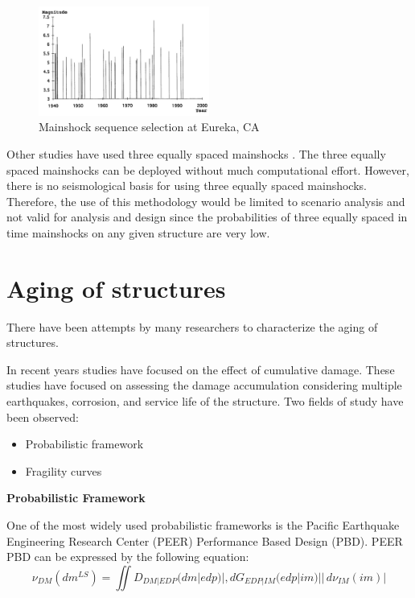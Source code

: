 \begin{figure}[htbp]
\centering
\includegraphics[width=0.5\textwidth]{Chapter-2/figs/Mainshock_sequence_01}
\caption{Mainshock sequence selection at Eureka, CA \cite{Sunasaka1993}}
\label{fig:MS-MS_Sunasaka}
\end{figure}

Other studies have used three equally spaced mainshocks \cite{Hatzigeorgiou2009}. The three equally spaced mainshocks can be deployed without much computational effort. However, there is no seismological basis for using three equally spaced mainshocks. Therefore, the use of this methodology would be limited to scenario analysis and not valid for analysis and design since the probabilities of three equally spaced in time mainshocks on any given structure are very low.

\section{Aging of structures}

There have been attempts by many researchers to characterize the aging of structures.

In recent years studies have focused on the effect of cumulative damage. These studies have focused on assessing the damage accumulation considering multiple earthquakes, corrosion, and service life of the structure. Two fields of study have been observed:

\begin{itemize}
	\item Probabilistic framework
	\item Fragility curves
\end{itemize}

\textbf{Probabilistic Framework}

One of the most widely used probabilistic frameworks is the Pacific Earthquake Engineering Research Center (PEER) Performance Based Design (PBD). PEER PBD can be expressed by the following equation:
\begin{equation}
\nu_{DM}(dm^{LS})=\iint D_{DM|EDP}(dm|edp)|,dG_{EDP|IM}(edp|im)||\,d\nu_{IM}(im)|
\end{equation}

